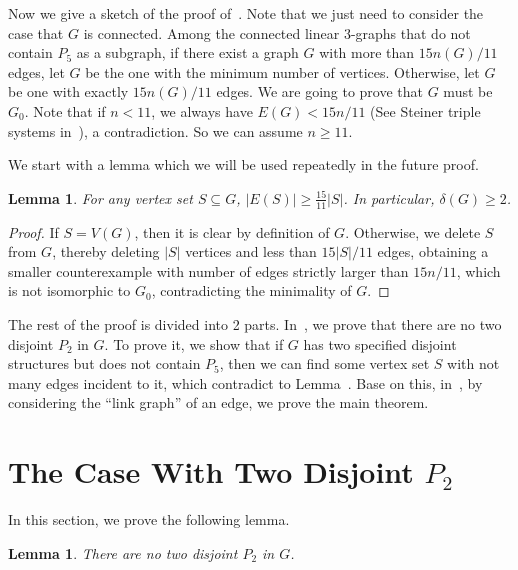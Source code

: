 \documentclass[a4paper]{article}
\newtheorem{lem}[thm]{Lemma}
\begin{document}
Now we give a sketch of the proof of~. Note that we just need to consider the case that $G$ is connected. Among the connected linear 3-graphs that do not contain $P_5$ as a subgraph, if there exist a graph $G$ with more than $15n(G)/11$ edges, let $G$ be the one with the minimum number of vertices. Otherwise, let $G$ be one with exactly $15n(G)/11$ edges. We are going to prove that $G$ must be $G_0$. Note that if $n<11$, we always have $E (G)<15n/11$ (See Steiner triple systems in~\cite{ea299c3877e64a5b996676debaabb8d3}), a contradiction. So we can assume $n\geq 11$.

We start with a lemma which we will be used repeatedly in the future proof.

\begin{lem}\label{contradiction}
    For any vertex set $S\subseteq G$, $|E(S)| \ge \frac{15}{11}|S|$. In particular, $\delta(G)\ge 2$.
\end{lem}
\begin{proof}If $S = V(G)$, then it is clear by definition of $G$. Otherwise, we delete $S$ from $G$, thereby deleting $|S|$ vertices and less than $15|S|/11$ edges, obtaining a smaller counterexample with number of edges strictly larger than $15n/11$, which is not isomorphic to $G_0$, contradicting the minimality of $G$.
\end{proof}




The rest of the proof is divided into 2 parts. 
In~, we prove that there are no two disjoint $P_2$ in $G$. To prove it, we show that if $G$ has two specified disjoint structures but does not contain $P_5$, then we can find some vertex set $S$ with not many edges incident to it, which contradict to Lemma~. 
Base on this, in~, by considering the ``link graph'' of an edge, we prove the main theorem. 

\section{The Case With Two Disjoint $P_2$}\label{section3}

In this section, we prove the following lemma.

\begin{lem}\label{S2S2}
    There are no two disjoint $P_2$ in $G$.
\end{lem}
\end{document}
